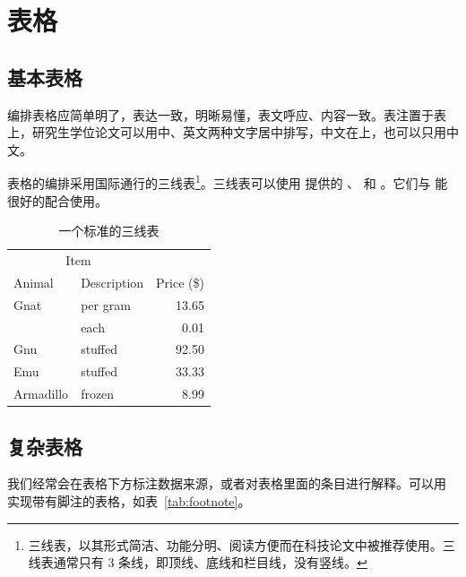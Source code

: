 \section{表格}

\subsection{基本表格}

编排表格应简单明了，表达一致，明晰易懂，表文呼应、内容一致。表注置于表上，研究生学位论文可以用中、英文两种文字居中排写，中文在上，也可以只用中文。

表格的编排采用国际通行的三线表\footnote{三线表，以其形式简洁、功能分明、阅读方便而在科技论文中被推荐使用。三线表通常只有 3 条线，即顶线、底线和栏目线，没有竖线。}。三线表可以使用  提供的 、 和 。它们与  能很好的配合使用。

\begin{table}[!htp]
  \centering
  \caption[一个标准的三线表]{一个标准的三线表\footnotemark}
  \label{tab:firstone}
  \begin{tabular}{llr}  
    \toprule
    \multicolumn{2}{c}{Item} \\
    \cmidrule(r){1-2}
    Animal    & Description & Price (\$) \\
    \midrule
    Gnat      & per gram    & 13.65      \\
              &    each     & 0.01       \\
    Gnu       & stuffed     & 92.50      \\
    Emu       & stuffed     & 33.33      \\
    Armadillo & frozen      & 8.99       \\
    \bottomrule
  \end{tabular}
\end{table}
  
\subsection{复杂表格}

我们经常会在表格下方标注数据来源，或者对表格里面的条目进行解释。可以用 实现带有脚注的表格，如表~\ref{tab:footnote}。

